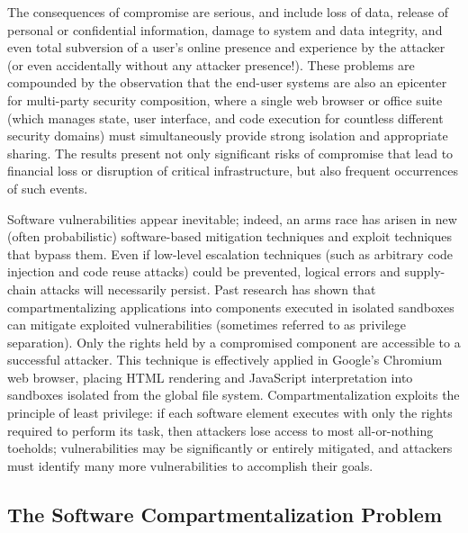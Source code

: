 The consequences of compromise are serious, and include loss of data, release of
personal or confidential information, damage to system and data integrity, and even total
subversion of a user's online presence and experience by the attacker (or even
accidentally without any attacker presence!).
These problems are compounded by the observation that the end-user systems are also an
epicenter for multi-party security composition, where a single web browser or office suite
(which manages state, user interface, and code execution for countless different security domains)
must simultaneously provide strong isolation and appropriate sharing.
The results present not only significant risks of compromise that lead to financial loss or
disruption of critical infrastructure, but also frequent occurrences of such events.

Software vulnerabilities appear inevitable;
indeed, an arms race has arisen in new
(often probabilistic) software-based mitigation techniques and exploit
techniques that bypass them.
Even if low-level escalation techniques (such as arbitrary code injection and
code reuse attacks) could be prevented, logical errors and supply-chain
attacks will necessarily persist.
Past research has shown that compartmentalizing applications into components executed
in isolated sandboxes can mitigate exploited vulnerabilities (sometimes referred to as privilege
separation).
Only the rights held by a compromised component are accessible to a successful attacker.
This technique is effectively applied in Google's Chromium web browser, placing HTML
rendering and JavaScript interpretation into sandboxes isolated from the global file system.
Compartmentalization exploits the principle of least privilege: if each software element executes with
only the rights required to perform its task, then attackers lose access to most all-or-nothing
toeholds; vulnerabilities may be significantly or entirely mitigated, and attackers must identify
many more vulnerabilities to accomplish their goals.

\subsection{The Software Compartmentalization Problem}

